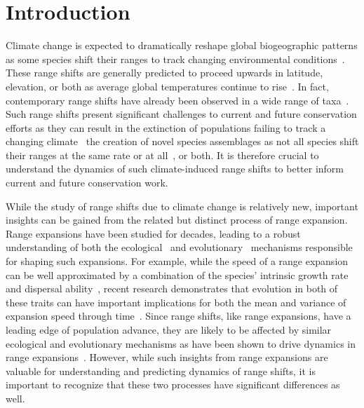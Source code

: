 \documentclass[12pt, oneside]{article}
\begin{document}
\newpage

\section*{Introduction}
Climate change is expected to dramatically reshape global biogeographic patterns as some species shift their ranges to track changing environmental conditions~\citep{gonzalez2010global}. These range shifts are generally predicted to proceed upwards in latitude, elevation, or both as average global temperatures continue to rise~\citep{loarie2009velocity}. In fact, contemporary range shifts have already been observed in a wide range of taxa~\citep{chen2011rapid, parmesan2006ecological}. Such range shifts present significant challenges to current and future conservation efforts as they can result in the extinction of populations failing to track a changing climate~\citep{parmesan2006ecological} the creation of novel species assemblages as not all species shift their ranges at the same rate or at all~\citep{hobbs2009novel}, or both. It is therefore crucial to understand the dynamics of such climate-induced range shifts to better inform current and future conservation work.

While the study of range shifts due to climate change is relatively new, important insights can be gained from the related but distinct process of range expansion. Range expansions have been studied for decades, leading to a robust understanding of both the ecological~\citep{hastings2005spatial} and evolutionary~\citep{shine2011evolutionary, excoffier2009genetic} mechanisms responsible for shaping such expansions. For example, while the speed of a range expansion can be well approximated by a combination of the species' intrinsic growth rate and dispersal ability~\citep{hastings2005spatial}, recent research demonstrates that evolution in both of these traits can have important implications for both the mean and variance of expansion speed through time~\citep{weiss2017rapid, ochocki2017rapid, szHucs2017rapid, shaw2015dispersal}. Since range shifts, like range expansions, have a leading edge of population advance, they are likely to be affected by similar ecological and evolutionary mechanisms as have been shown to drive dynamics in range expansions~\citep{hargreaves2014evolution}. However, while such insights from range expansions are valuable for understanding and predicting dynamics of range shifts, it is important to recognize that these two processes have significant differences as well.
\end{document}
